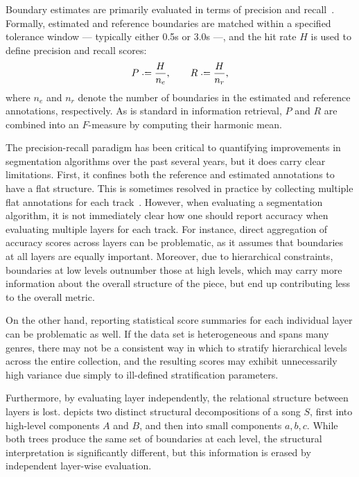 \documentclass{article}
\begin{document}
Boundary estimates are primarily evaluated in terms of precision and recall~\cite{turnbull2007supervised}.  Formally, estimated and
reference boundaries are matched within a specified tolerance window --- typically either 0.5s or 3.0s ---, and the hit rate $H$ is
used to define precision and recall scores:
\begin{equation}
P \defeq \frac{H}{n_e}, \quad\quad R \defeq \frac{H}{n_r},
\end{equation}
where $n_e$ and $n_r$ denote the number of boundaries in the estimated and reference annotations, respectively.  As is standard in
information retrieval, $P$ and $R$ are combined into an $F$-measure by computing their harmonic mean.

The precision-recall paradigm has been critical to quantifying improvements in segmentation algorithms over the past several years,
but it does carry clear limitations.  First, it confines both the reference and estimated annotations to have a flat structure.  
This is sometimes resolved in practice by collecting multiple flat annotations for each track~\cite{Smith2011}.  
However, when evaluating a segmentation algorithm, it is not immediately clear how one should report accuracy when evaluating multiple 
layers for each track.  For instance, direct aggregation of accuracy scores across layers can be problematic,
as it assumes that boundaries at all layers are equally important.  Moreover, due to hierarchical constraints, boundaries at low
levels outnumber those at high levels, which may carry more information about the overall structure of the piece, but end up 
contributing less to the overall metric.

On the other hand, reporting statistical score summaries for each individual layer can be problematic as well.  If the data set is
heterogeneous and spans many genres, there may not be a consistent way in which to stratify hierarchical levels across the entire
collection, and the resulting scores may exhibit unnecessarily high variance due simply to ill-defined stratification parameters.

Furthermore, by evaluating layer independently, the relational structure between layers is lost.  
depicts two distinct structural decompositions of a song $S$, first into high-level components $A$ and $B$, and then into small
components $a, b, c$.  While both trees produce the same set of boundaries at each level, the structural interpretation is
significantly different, but this information is erased by independent layer-wise evaluation.
\end{document}
